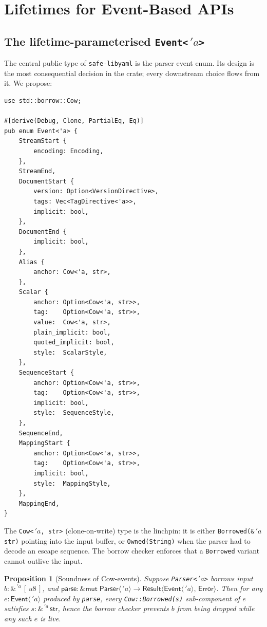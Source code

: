 \documentclass[12pt]{article}
\newtheorem{proposition}[theorem]{Proposition}
\theoremstyle{definition}
\theoremstyle{remark}
\newcommand{\lifetime}[1]{\ensuremath{\,'\!#1}}
\newcommand{\borrow}[2]{\ensuremath{\&^{#1}\,#2}}
\newcommand{\mutborrow}[1]{\ensuremath{\&\mathsf{mut}\;#1}}
\newcommand{\Result}[2]{\ensuremath{\mathsf{Result}\langle #1,\,#2\rangle}}
\newcommand{\Slice}[1]{\ensuremath{[\,#1\,]}}
\begin{document}
\section{Lifetimes for Event-Based APIs}
\label{sec:lifetimes-events}

\subsection{\texorpdfstring{The lifetime-parameterised \texttt{Event<\lifetime{a}>}}{The lifetime-parameterised Event<'a>}}

The central public type of \texttt{safe-libyaml} is the parser event enum.
Its design is the most consequential decision in the crate; every downstream
choice flows from it. We propose:

\begin{lstlisting}
use std::borrow::Cow;

#[derive(Debug, Clone, PartialEq, Eq)]
pub enum Event<'a> {
    StreamStart {
        encoding: Encoding,
    },
    StreamEnd,
    DocumentStart {
        version: Option<VersionDirective>,
        tags: Vec<TagDirective<'a>>,
        implicit: bool,
    },
    DocumentEnd {
        implicit: bool,
    },
    Alias {
        anchor: Cow<'a, str>,
    },
    Scalar {
        anchor: Option<Cow<'a, str>>,
        tag:    Option<Cow<'a, str>>,
        value:  Cow<'a, str>,
        plain_implicit: bool,
        quoted_implicit: bool,
        style:  ScalarStyle,
    },
    SequenceStart {
        anchor: Option<Cow<'a, str>>,
        tag:    Option<Cow<'a, str>>,
        implicit: bool,
        style:  SequenceStyle,
    },
    SequenceEnd,
    MappingStart {
        anchor: Option<Cow<'a, str>>,
        tag:    Option<Cow<'a, str>>,
        implicit: bool,
        style:  MappingStyle,
    },
    MappingEnd,
}
\end{lstlisting}

The \texttt{Cow<\lifetime{a}, str>} (clone-on-write) type is the linchpin: it
is either \texttt{Borrowed(\&\lifetime{a} str)} pointing into the input
buffer, or \texttt{Owned(String)} when the parser had to decode an escape
sequence. The borrow checker enforces that a \texttt{Borrowed} variant cannot
outlive the input.

\begin{proposition}[Soundness of Cow-events]
\label{prop:cow-events}
Suppose \texttt{Parser<\lifetime{a}>} borrows input $b : \borrow{\lifetime{a}}{\Slice{u8}}$,
and $\mathsf{parse}: \mutborrow{\mathsf{Parser}\langle\lifetime{a}\rangle}
\to \Result{\mathsf{Event}\langle\lifetime{a}\rangle}{\mathsf{Error}}$.
Then for any $e : \mathsf{Event}\langle\lifetime{a}\rangle$ produced by
\texttt{parse}, every \texttt{Cow::Borrowed(s)} sub-component of $e$
satisfies $s : \borrow{\lifetime{a}}{\mathsf{str}}$, hence the borrow
checker prevents $b$ from being dropped while any such $e$ is live.
\end{proposition}
\end{document}
